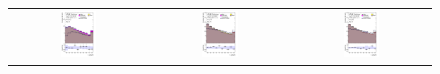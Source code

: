 %
\begin{figure}[H]
\centering
\begin{tabular}{@{}ccc@{}}
\includegraphics[page=1,width=0.28\textwidth]{figures/new_pt/log_or_nolog/tuH_reg1l2tau1bnj_os_log_.pdf} &
\includegraphics[page=1,width=0.28\textwidth]{figures/new_pt/log_or_nolog/tuH_reg1l1tau1b1j_ss_log_.pdf}&
\includegraphics[page=1,width=0.28\textwidth]{figures/new_pt/log_or_nolog/tuH_reg1l1tau1b2j_ss_log_.pdf}\\

\end{tabular}
\end{figure}
